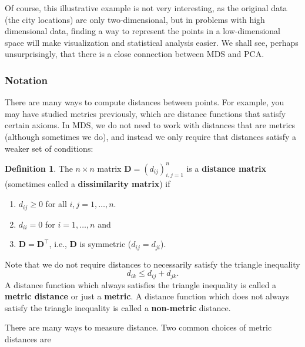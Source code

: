 \documentclass[
]{book}
\providecommand{\tightlist}{%
  \setlength{\itemsep}{0pt}\setlength{\parskip}{0pt}}
\theoremstyle{definition}
\newtheorem{definition}{Definition}[chapter]
\theoremstyle{definition}
\theoremstyle{definition}
\theoremstyle{definition}
\theoremstyle{remark}
\begin{document}
Of course, this illustrative example is not very interesting, as the original data (the city locations) are only two-dimensional, but in problems with high dimensional data, finding a way to
represent the points in a low-dimensional space will make visualization and statistical analysis easier. We shall see, perhaps unsurprisingly, that there is a close connection between MDS and PCA.

\hypertarget{notation-2}{%
\subsubsection*{Notation}\label{notation-2}}

There are many ways to compute distances between points. For example, you may have studied metrics previously, which are distance functions that satisfy certain axioms. In MDS, we do not need to work with distances that are metrics (although sometimes we do), and instead we only require that distances satisfy a weaker set of conditions:

\begin{definition}
\protect\hypertarget{def:distanceD}{}{\label{def:distanceD} }The \(n \times n\) matrix \(\mathbf D=(d_{ij})_{i,j=1}^n\) is a \textbf{distance matrix} (sometimes called a \textbf{dissimilarity matrix}) if

\begin{enumerate}
\def\labelenumi{\arabic{enumi}.}
\tightlist
\item
  \(d_{ij}\geq 0\) for all \(i, j=1,\ldots,n\).
\item
  \(d_{ii}=0\) for \(i=1,\ldots, n\) and
\item
  \(\mathbf D=\mathbf D^\top\), i.e., \(\mathbf D\) is symmetric (\(d_{ij}=d_{ji}\)).
\end{enumerate}
\end{definition}

Note that we do not require distances to necessarily satisfy the triangle inequality
\begin{equation}
d_{ik} \leq d_{ij}+d_{jk}.
\label{eq:triangle}
\end{equation}
A distance function which always satisfies the triangle inequality is called a \textbf{metric distance}
or just a \textbf{metric}. A distance function which does not always satisfy the triangle inequality is called a
\textbf{non-metric} distance.

There are many ways to measure distance. Two common choices of metric distances are
\end{document}
